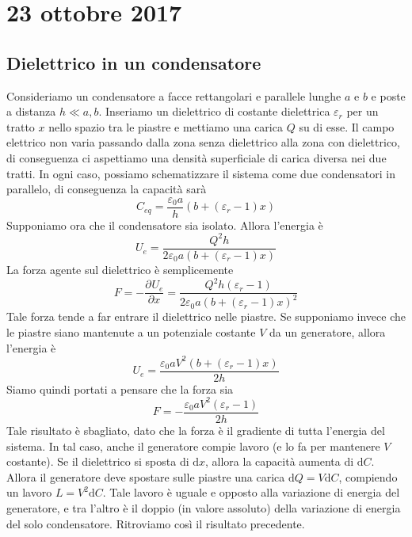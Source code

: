 \documentclass[a4paper,11pt]{book}
\newcommand{\der}[3][]{\frac{\partial ^{#1}#2}{\partial #3^{#1}}}
\newcommand{\dif}{\mathrm{d}}
\let\oldepsilon\epsilon
\let\oldvarepsilon\varepsilon
\renewcommand{\epsilon}{\oldvarepsilon}
\renewcommand{\varepsilon}{\oldepsilon}
\theoremstyle{definition}
\theoremstyle{theorem}
\begin{document}
\section{23 ottobre 2017}
	\subsection{Dielettrico in un condensatore}
	Consideriamo un condensatore a facce rettangolari e parallele lunghe $a$ e $b$ e poste a distanza $h\ll a,b$. Inseriamo un dielettrico di costante dielettrica $\epsilon_r$ per un tratto $x$ nello spazio tra le piastre e mettiamo una carica $Q$ su di esse. Il campo elettrico non varia passando dalla zona senza dielettrico alla zona con dielettrico, di conseguenza ci aspettiamo una densità superficiale di carica diversa nei due tratti. In ogni caso, possiamo schematizzare il sistema come due condensatori in parallelo, di conseguenza la capacità sarà
	\[C_{eq}=\frac{\epsilon_0a}{h}(b+(\epsilon_r-1)x)\]
	Supponiamo ora che il condensatore sia isolato. Allora l'energia è
	\[U_e=\frac{Q^2h}{2\epsilon_0a(b+(\epsilon_r-1)x)}\]
	La forza agente sul dielettrico è semplicemente
	\[F=-\der{U_e}{x}=\frac{Q^2h(\epsilon_r-1)}{2\epsilon_0a(b+(\epsilon_r-1)x)^2}\]
	Tale forza tende a far entrare il dielettrico nelle piastre. Se supponiamo invece che le piastre siano mantenute a un potenziale costante $V$ da un generatore, allora l'energia è
	\[U_e=\frac{\epsilon_0aV^2(b+(\epsilon_r-1)x)}{2h}\]
	Siamo quindi portati a pensare che la forza sia
	\[F=-\frac{\epsilon_0aV^2(\epsilon_r-1)}{2h}\]
	Tale risultato è sbagliato, dato che la forza è il gradiente di tutta l'energia del sistema. In tal caso, anche il generatore compie lavoro (e lo fa per mantenere $V$ costante). Se il dielettrico si sposta di $\dif x$, allora la capacità aumenta di $\dif C$. Allora il generatore deve spostare sulle piastre una carica $\dif Q=V\dif C$, compiendo un lavoro $L=V^2\dif C$. Tale lavoro è uguale e opposto alla variazione di energia del generatore, e tra l'altro è il doppio (in valore assoluto) della variazione di energia del solo condensatore. Ritroviamo così il risultato precedente.
\end{document}
